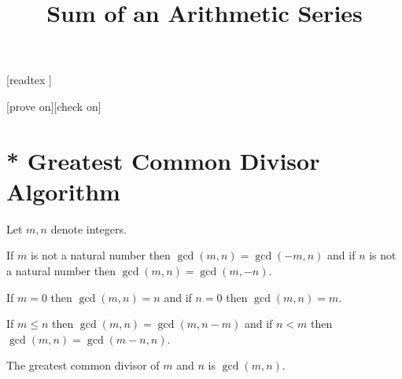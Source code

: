 \documentclass{article}
\title{Sum of an Arithmetic Series}
\author{}
\date{}
\begin{document}
\maketitle

\begin{forthel}

    [readtex ]

    [prove on][check on]
  \end{forthel}



\section{* Greatest Common Divisor Algorithm}

\begin{forthel}
Let $m,n$ denote integers.






\begin{axiom}
If $m$ is not a natural number then $\gcd(m,n) = \gcd(-m,n)$ and
if $n$ is not a natural number then $\gcd(m,n) = \gcd(m,-n)$.
\end{axiom}
\begin{axiom}
If $m=0$ then $\gcd(m,n)=n$ and if $n=0$ then $\gcd(m,n)=m$.
\end{axiom}
\begin{axiom}
If $m \leq n$ then $\gcd(m,n) = \gcd(m,n-m)$ and if $n < m$ then $\gcd(m,n) = \gcd(m-n,n)$.
\end{axiom}


\begin{proposition}
The greatest common divisor of $m$ and $n$ is $\gcd(m,n)$.
\end{proposition}

\end{forthel}
\end{document}
